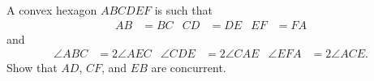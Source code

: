 \documentclass[varwidth]{standalone}
\begin{document}
    A convex hexagon $ABCDEF$ is such that
    \begin{align*}
        AB & = BC & CD & = DE & EF & = FA
    \end{align*}
    and
    \begin{align*}
        \angle ABC & = 2 \angle AEC & \angle CDE & = 2 \angle CAE & \angle EFA & = 2 \angle ACE.
    \end{align*}
    Show that $AD$, $CF$, and $EB$ are concurrent.
\end{document}
